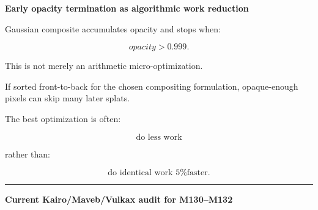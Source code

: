 \textbf{Early opacity termination as algorithmic work reduction}

Gaussian composite accumulates opacity and stops when:

\[
opacity>0.999.
\]

This is not merely an arithmetic micro-optimization.

If sorted front-to-back for the chosen compositing formulation, opaque-enough pixels can skip many later splats.

The best optimization is often:

\[
\boxed{
\text{do less work}
}
\]

rather than:

\[
\text{do identical work 5\% faster}.
\]

\begin{center}\rule{0.5\linewidth}{0.5pt}\end{center}

\textbf{Current Kairo/Maveb/Vulkax audit for M130--M132}

